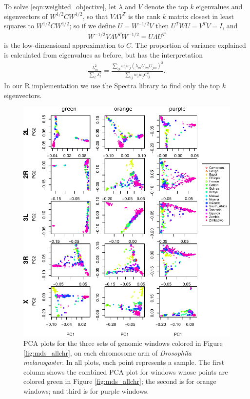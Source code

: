 \documentclass[11pt, oneside]{article}   	%
\begin{document}
To solve \eqref{eqn:weighted_objective},
let $\lambda$ and $V$ denote the top $k$ eigenvalues and eigenvectors of $W^{1/2} C W^{1/2}$,
so that $V \Lambda V^T$ is the rank $k$ matrix closest in least squares to $W^{1/2} C W^{1/2}$;
so if we define $U = W^{-1/2} V$
then $U^T W U = V^T V = I$,
and 
\begin{align*}
    W^{-1/2} V \Lambda V^T W^{-1/2} 
    =
    U \Lambda U^T
\end{align*}
is the low-dimensional approximation to $C$.
The proportion of variance explained is calculated from eigenvalues as before,
but has the interpretation
\begin{align*}
    \frac{ \lambda_m^2 }{ \sum_\ell \lambda_\ell^2 } 
    = 
    \frac{ \sum_{ij} w_i w_j ( \lambda_m U_{im} U_{jm} )^2 }{ \sum_{ij} w_i w_j C_{ij}^2 } .
\end{align*}
In our R implementation we use the Spectra library \citep{qiu2016rspectra}
to find only the top $k$ eigenvectors.

\begin{figure}
    \begin{center}
       \includegraphics[width=1\textwidth]{Fig2_pca_plots_allchr_3peaks_label_update}
    \end{center}
    \caption{      
        PCA plots for the three sets of genomic windows colored in Figure \ref{fig:mds_allchr},
        on each chromosome arm of \textit{Drosophila melanogaster}.
        In all plots, each point represents a sample. 
        The first column shows the combined PCA plot for windows 
        whose points are colored green in Figure \ref{fig:mds_allchr}; 
        the second is for orange windows; 
        and third is for purple windows.
         \label{fig:pca_by_pop}
    }
\end{figure}
\end{document}
